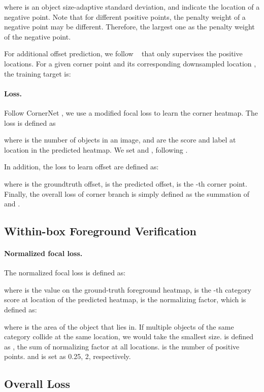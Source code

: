 \documentclass{article}
\begin{document}
where  is an object size-adaptive standard deviation,  and  indicate the location of a negative point. Note that for different positive points, the penalty weight of a negative point may be different. Therefore, the largest one as the penalty weight of the negative point.

For additional offset prediction, we follow ~\cite{CornerNet} that only supervises the positive locations. For a given corner point  and its corresponding downsampled location , the training target is:


\paragraph{Loss.} Follow CornerNet \cite{CornerNet}, we use a modified focal loss \cite{RetinaNet} to learn the corner heatmap. The loss is defined as

where  is the number of objects in an image,   and  are the score and label at location  in the predicted heatmap. We set  and , following \cite{CornerNet}.

In addition, the loss to learn offset are defined as:

where  is the groundtruth offset,  is the predicted offset,  is the -th corner point. Finally, the overall loss  of corner branch is simply defined as the summation of  and .

\subsection{Within-box Foreground Verification}

\paragraph{Normalized focal loss.} The normalized focal loss is defined as:



where  is the value on the ground-truth foreground heatmap,  is the -th category score at location  of the predicted heatmap,  is the normalizing factor, which is defined as:

where  is the area of the object that  lies in. If multiple objects of the same category collide at the same location, we would take the smallest size.  is defined as , the sum of normalizing factor at all locations.  is the number of positive points.  and  is set as 0.25, 2, respectively.

\subsection{Overall Loss}
\end{document}
